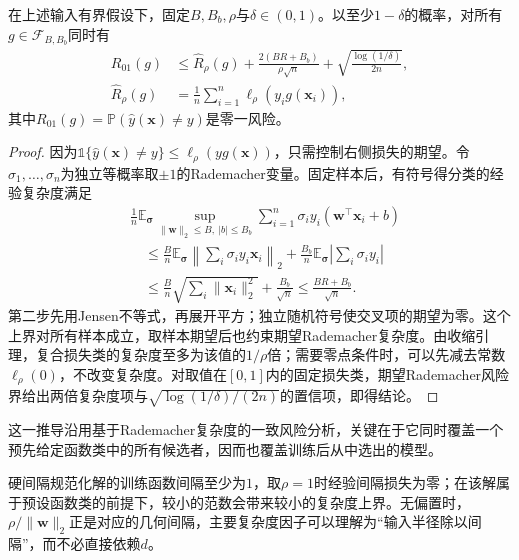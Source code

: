 \begin{theorem}[含偏置的间隔风险界]
  \label{thm:classification-svm-margin-bound}
  在上述输入有界假设下，固定$B,B_b,\rho$与$\delta\in(0,1)$。以至少$1-\delta$的概率，对所有$g\in\mathcal{F}_{B,B_b}$同时有
  \begin{equation}
    \begin{aligned}
      R_{01}(g)
      &\le \widehat R_\rho(g)
       +\frac{2(BR+B_b)}{\rho\sqrt n}
       +\sqrt{\frac{\log(1/\delta)}{2n}},\\
      \widehat R_\rho(g)
      &=\frac1n\sum_{i=1}^n\ell_\rho(y_i g(\bm{x}_i)),
    \end{aligned}
    \label{eq:classification-svm-margin-bound}
  \end{equation}
  其中$R_{01}(g)=\mathbb{P}(\hat y(\bm{x})\ne y)$是零一风险。
\end{theorem}
\begin{proof}
因为$\mathbb{1}\{\hat y(\bm{x})\ne y\}\le\ell_\rho(y g(\bm{x}))$，只需控制右侧损失的期望。令$\sigma_1,\ldots,\sigma_n$为独立等概率取$\pm1$的Rademacher变量。固定样本后，有符号得分类的经验复杂度满足
\[
  \begin{aligned}
    &\frac1n\mathbb{E}_{\bm{\sigma}}
      \sup_{\lVert\bm{w}\rVert_2\le B,\ |b|\le B_b}
      \sum_{i=1}^n\sigma_i y_i
       (\bm{w}^{\top}\bm{x}_i+b)\\
    &\quad\le
      \frac{B}{n}\mathbb{E}_{\bm{\sigma}}
        \left\lVert\sum_i\sigma_i y_i\bm{x}_i\right\rVert_2
      +\frac{B_b}{n}\mathbb{E}_{\bm{\sigma}}
        \left|\sum_i\sigma_i y_i\right|\\
    &\quad\le
      \frac{B}{n}\sqrt{\sum_i\lVert\bm{x}_i\rVert_2^2}
      +\frac{B_b}{\sqrt n}
      \le\frac{BR+B_b}{\sqrt n}.
  \end{aligned}
\]
第二步先用Jensen不等式，再展开平方；独立随机符号使交叉项的期望为零。这个上界对所有样本成立，取样本期望后也约束期望Rademacher复杂度。由收缩引理，复合损失类的复杂度至多为该值的$1/\rho$倍；需要零点条件时，可以先减去常数$\ell_\rho(0)$，不改变复杂度。对取值在$[0,1]$内的固定损失类，期望Rademacher风险界给出两倍复杂度项与$\sqrt{\log(1/\delta)/(2n)}$的置信项，即得结论。
\end{proof}

这一推导沿用基于Rademacher复杂度的一致风险分析，关键在于它同时覆盖一个预先给定函数类中的所有候选者，因而也覆盖训练后从中选出的模型。

硬间隔规范化解的训练函数间隔至少为$1$，取$\rho=1$时经验间隔损失为零；在该解属于预设函数类的前提下，较小的范数会带来较小的复杂度上界。无偏置时，$\rho/\lVert\bm{w}\rVert_2$正是对应的几何间隔，主要复杂度因子可以理解为“输入半径除以间隔”，而不必直接依赖$d$。

